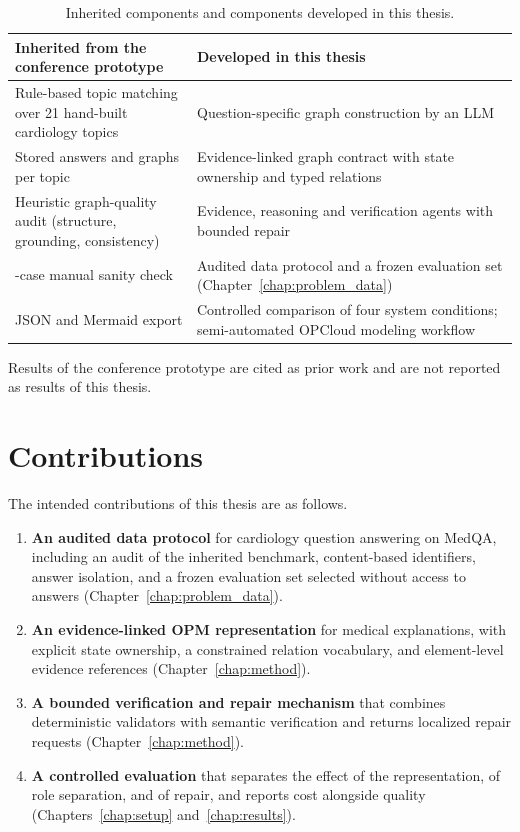 \begin{table}[H]
\centering
\caption{Inherited components and components developed in this thesis.}
\label{tab:prior_vs_thesis}
\small
\begin{tabularx}{\linewidth}{>{\raggedright\arraybackslash}X >{\raggedright\arraybackslash}X}
\toprule
Inherited from the conference prototype & Developed in this thesis \\
\midrule
Rule-based topic matching over 21 hand-built cardiology topics & Question-specific graph construction by an LLM \\
Stored answers and graphs per topic & Evidence-linked graph contract with state ownership and typed relations \\
Heuristic graph-quality audit (structure, grounding, consistency) & Evidence, reasoning and verification agents with bounded repair \\
20-case manual sanity check & Audited data protocol and a frozen evaluation set (Chapter~\ref{chap:problem_data}) \\
JSON and Mermaid export & Controlled comparison of four system conditions; semi-automated OPCloud modeling workflow \\
\bottomrule
\end{tabularx}
\end{table}

Results of the conference prototype are cited as prior work and are not reported as results of this thesis.

\section{Contributions}
\label{sec:contributions}

The intended contributions of this thesis are as follows.

\begin{enumerate}
  \item \textbf{An audited data protocol} for cardiology question answering on MedQA, including an audit of the inherited benchmark, content-based identifiers, answer isolation, and a frozen evaluation set selected without access to answers (Chapter~\ref{chap:problem_data}).
  \item \textbf{An evidence-linked OPM representation} for medical explanations, with explicit state ownership, a constrained relation vocabulary, and element-level evidence references (Chapter~\ref{chap:method}).
  \item \textbf{A bounded verification and repair mechanism} that combines deterministic validators with semantic verification and returns localized repair requests (Chapter~\ref{chap:method}).
  \item \textbf{A controlled evaluation} that separates the effect of the representation, of role separation, and of repair, and reports cost alongside quality (Chapters~\ref{chap:setup} and~\ref{chap:results}).
\end{enumerate}

